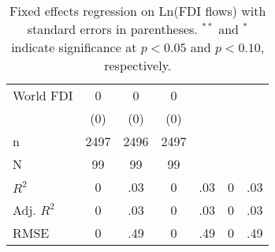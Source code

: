 \begin{table}[ht]
{\begin{tabular}{lccc}
  World FDI & 0 & 0 & 0 \\ 
   & (0) & (0) & (0) \\ 
   \hline
n & 2497 & 2496 & 2497 \\ 
  N & 99 & 99 & 99 \\ 
  $R^{2}$ & 0&.03 & 0&.03 & 0&.03 \\ 
  Adj. $R^{2}$ & 0&.03 & 0&.03 & 0&.03 \\ 
  RMSE & 0&.49 & 0&.49 & 0&.49 \\ 
   \hline
\hline
\end{tabular}
}
\caption{Fixed effects regression on Ln(FDI flows) with standard errors in parentheses. $^{**}$ and $^{*}$ indicate significance at $p< 0.05 $ and $p< 0.10 $, respectively.} 
\end{table}

